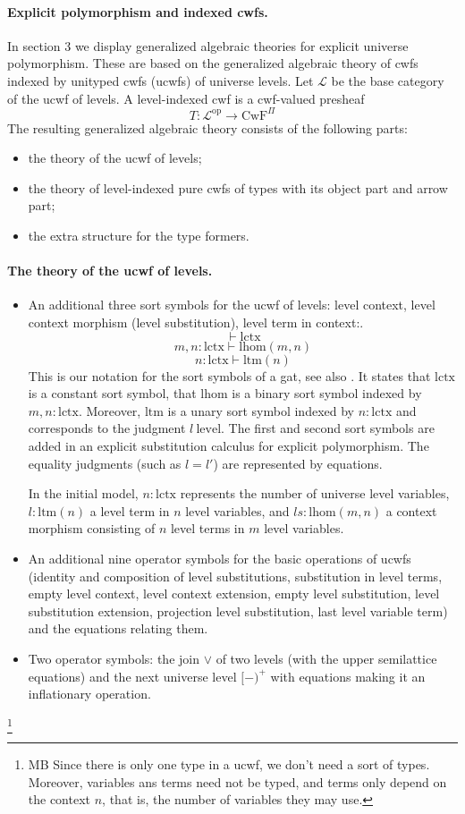 \documentclass[11pt,a4paper]{article}
\theoremstyle{definition}
\newcommand{\op}{\mathrm{op}}
\def\lhom{\mathrm{lhom}}
\def\lctx{\mathrm{lctx}}
\def\ltm{\mathrm{ltm}}
\def\level{\mathrm{level}}
\def\L{{\mathcal{L}}}
\def\CwF{\mathrm{CwF}}
\begin{document}
\paragraph{Explicit polymorphism and indexed cwfs.} In section 3 we display generalized algebraic theories for explicit universe polymorphism. These are based on the generalized algebraic theory of cwfs indexed by unityped cwfs (ucwfs) of universe levels. Let $\L$ be the base category of the ucwf of levels. A level-indexed cwf is a cwf-valued presheaf 
$$
T : \L^\op \to \CwF^\Pi
$$
The resulting generalized algebraic theory consists of the following parts: \begin{itemize}
\item the theory of the ucwf of levels;
\item the theory of level-indexed pure cwfs of types with its object part and
arrow part;
\item the extra structure for the type formers.
\end{itemize}

\paragraph{The theory of the ucwf of levels.}
\begin{itemize}
\item An additional three sort symbols for the ucwf of levels: level context, level context morphism (level substitution), level term in context:. 
$$
\vdash \lctx
$$
$$
m,n : \lctx \vdash \lhom(m,n)
$$
$$
n : \lctx \vdash  \ltm(n)
$$
This is our notation for the sort symbols of a gat, see also \cite{bezem:hofmann}. It states that $\lctx$ is a constant sort symbol, that $\lhom$ is a binary sort symbol indexed by $m,n : \lctx$. Moreover, $\ltm$ is a unary sort symbol indexed by $n : \lctx$ and corresponds to the judgment $l\ \level$. The first and second sort symbols are added in an explicit substitution calculus for explicit polymorphism. The equality judgments (such as $l = l'$) are represented by equations.  

In the initial model, $n : \lctx$ represents the number of universe level variables, $l : \ltm(n)$ a level term in $n$ level variables, and $ls : \lhom(m,n)$ a context morphism consisting of $n$ level terms in $m$ level variables.

\item An additional nine operator symbols for the basic operations of ucwfs (identity and composition of level substitutions, substitution in level terms, empty level context, level context extension, empty level substitution, level substitution extension, projection level substitution, last level variable term) and the equations relating them.
\item Two operator symbols: the join $\vee$ of two levels (with the upper semilattice equations) and the next universe level $[-)^+$ with equations making it an inflationary operation.
\end{itemize}
%
\footnote{MB Since there is only one type in a ucwf, we don't need
a sort of types. Moreover, variables ans terms need not be typed, and
terms only depend on the context $n$, that is, the number of variables
they may use.}
\end{document}

